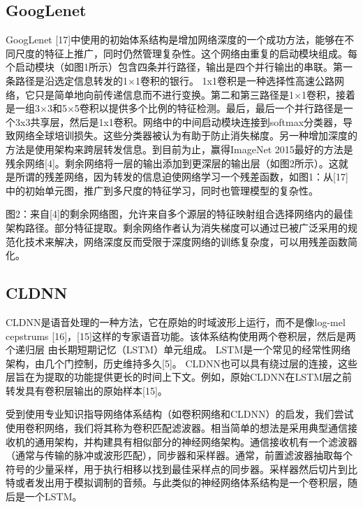 \subsection{GoogLenet}
GoogLenet [17]中使用的初始体系结构是增加网络深度的一个成功方法，能够在不同尺度的特征上推广，同时仍然管理复杂性。这个网络由重复的启动模块组成。每个启动模块（如图1所示）包含四条并行路径，输出是四个并行输出的串联。第一条路径是沿选定信息转发的1×1卷积的银行。 1x1卷积是一种选择性高速公路网络，它只是简单地向前传递信息而不进行变换。第二和第三路径是1×1卷积，接着是一组3×3和5×5卷积以提供多个比例的特征检测。最后，最后一个并行路径是一个3x3共享层，然后是1x1卷积。网络中的中间启动模块连接到softmax分类器，导致网络全球培训损失。这些分类器被认为有助于防止消失梯度。另一种增加深度的方法是使用架构来跨层转发信息。到目前为止，赢得ImageNet 2015最好的方法是残余网络[4]。剩余网络将一层的输出添加到更深层的输出层（如图2所示）。这就是所谓的残差网络，因为转发的信息迫使网络学习一个残差函数，如图1：从[17]中的初始单元图，推广到多尺度的特征学习，同时也管理模型的复杂性。\par

图2：来自[4]的剩余网络图，允许来自多个源层的特征映射组合选择网络内的最佳架构路径。部分特征提取。剩余网络作者认为消失梯度可以通过已被广泛采用的规范化技术来解决，网络深度反而受限于深度网络的训练复杂度，可以用残差函数简化。\par


\subsection{CLDNN}
CLDNN是语音处理的一种方法，它在原始的时域波形上运行，而不是像log-mel cepstrums [16]，[15]这样的专家语音功能。该体系结构使用两个卷积层，然后是两个递归层
由长期短期记忆（LSTM）单元组成。 LSTM是一个常见的经常性网络架构，由几个门控制，历史维持多久[5]。 CLDNN也可以具有绕过层的连接，这些层旨在为提取的功能提供更长的时间上下文。例如，原始CLDNN在LSTM层之前转发具有卷积层输出的原始样本[15]。\par

受到使用专业知识指导网络体系结构（如卷积网络和CLDNN）的启发，我们尝试使用卷积网络，我们将其称为卷积匹配滤波器。相当简单的想法是采用典型通信接收机的通用架构，并构建具有相似部分的神经网络架构。通信接收机有一个滤波器（通常与传输的脉冲或波形匹配），同步器和采样器。通常，前置滤波器抽取每个符号的少量采样，用于执行相移以找到最佳采样点的同步器。采样器然后切片到比特或者发出用于模拟调制的音频。与此类似的神经网络体系结构是一个卷积层，随后是一个LSTM。\par


